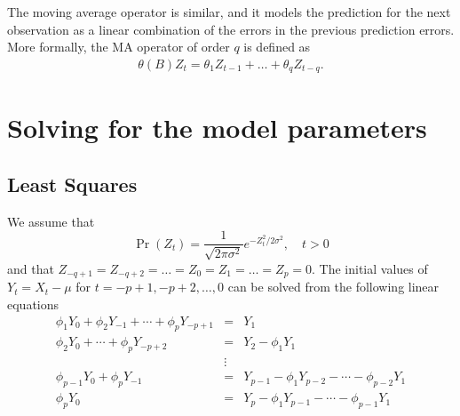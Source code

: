 The moving average operator is similar, and it models the prediction
for the next observation as a linear combination of the errors in the
previous prediction errors.  More formally, the MA operator of order
$q$ is defined as  
\begin{align}
\theta(B) Z_t =   \theta_{1} Z_{t-1} + \dots + \theta_{q} Z_{t-q}.
\end{align}

\section{Solving for the model parameters}\label{sec:para_est}

\subsection{Least Squares}\label{sec:CLS}
We assume that 
\begin{equation}
\Pr(Z_t) = \frac{1}{\sqrt{2 \pi \sigma^2}} e^{-Z^2_t/2 \sigma^2}, \quad t > 0
\end{equation}
and that  $Z_{-q+1} = Z_{-q+2} = \dots = Z_0 = Z_1 = \dots = Z_p =
0$. The initial values of $Y_t=X_t-\mu$ for $t=-p+1, -p+2, \dots,
0$ can be solved from the following linear equations
\begin{eqnarray}
\phi_1 Y_0 + \phi_2 Y_{-1} + \cdots + \phi_p Y_{-p+1} &=& Y_1 \nonumber\\
\phi_2 Y_0 + \cdots + \phi_p Y_{-p+2} &=& Y_2 - \phi_1 Y_1  \nonumber\\
&\vdots& \nonumber\\
\phi_{p-1} Y_0 + \phi_p Y_{-1} &=& Y_{p-1} - \phi_1 Y_{p-2} - \cdots -
\phi_{p-2} Y_1 \nonumber \\
\phi_p Y_0  &=& Y_p - \phi_1 Y_{p-1} - \cdots - \phi_{p-1} Y_{1} \label{eq:init_Y}
\end{eqnarray}

